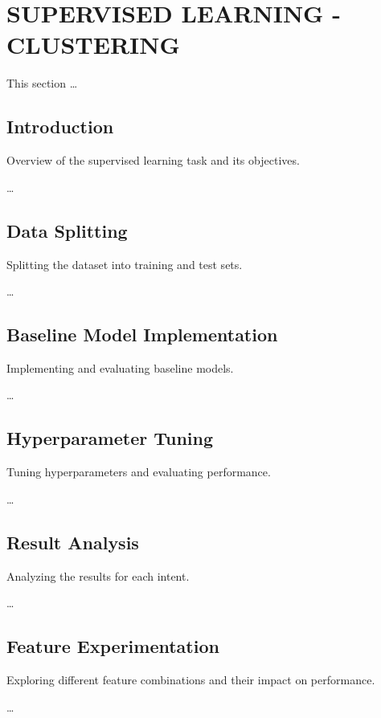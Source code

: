 

\section{SUPERVISED LEARNING - CLUSTERING}

    This section \ldots

    \subsection{Introduction}
    
        Overview of the supervised learning task and its objectives.

        \ldots

    \subsection{Data Splitting}
    
        Splitting the dataset into training and test sets.

        \ldots
        
    \subsection{Baseline Model Implementation}
    
        Implementing and evaluating baseline models.

        \ldots
        
    \subsection{Hyperparameter Tuning}
    
        Tuning hyperparameters and evaluating performance.

        \ldots
        
    \subsection{Result Analysis}
    
        Analyzing the results for each intent.

        \ldots
        
    \subsection{Feature Experimentation}
    
        Exploring different feature combinations and their impact on performance.

        \ldots
